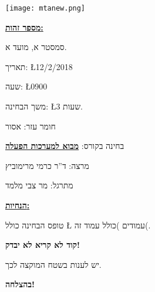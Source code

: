 \documentclass[12pt]{article}
\begin{document}
\hfil
\texttt{[image: mtanew.png]}
\hfil
\sethebrew
\par\noindent
\underline{\bf
מספר זהות:
}
\par\noindent
\fbox{\phantom{\Large 9}}
\fbox{\phantom{\Large 9}}
\fbox{\phantom{\Large 9}}
\fbox{\phantom{\Large 9}}
\fbox{\phantom{\Large 9}}
\fbox{\phantom{\Large 9}}
\fbox{\phantom{\Large 9}}
\fbox{\phantom{\Large 9}}
\fbox{\phantom{\Large 9}}

\hfill
\begin{minipage}{1.4in}
סמסטר א, מועד א.
\par\noindent
תאריך:
\L{12/2/2018}
\par\noindent
שעה:
\L{0900}
\par\noindent
משך הבחינה:
\L{3}
שעות.
\par\noindent
חומר עזר: אסור
\par\noindent
\end{minipage}
\vfill
{
\hfil
\Large
בחינה בקורס:
\underline{\bf
מבוא למערכות הפעלה
}
\hfil
}
\vspace{1Em}
\par\noindent
{
\large
\hfil
מרצה: ד''ר כרמי מרימוביץ
}
\par\noindent
{
\large
\hfil
מתרגל: מר צבי מלמד
}

\vspace{2Em}
\hfil
{}


\hfil
\vspace{2Em}
\par\noindent
\underline{\bf
הנחיות:
}
\par\noindent
טופס הבחינה כולל 
\L{\pageref{LastPage}}
 עמודים )כולל עמוד זה(.
\par\noindent
{\bf
{\Large
קוד לא קריא לא יבדק!
}
\par\noindent
יש לענות בשטח המוקצה לכך.
}
\par\noindent
\vfill
{
\hfil
\fontsize{60}{20}\selectfont
\bf
בהצלחה!
\hfil
}
\end{document}
